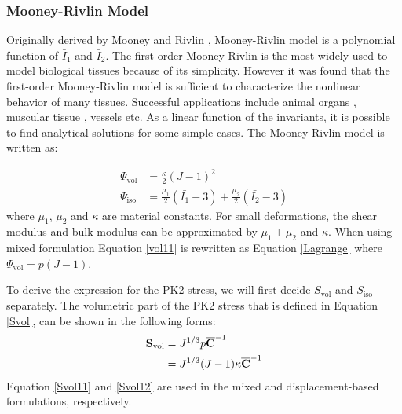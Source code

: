 \subsubsection{Mooney-Rivlin Model}
Originally derived by Mooney \cite{Mooney} and Rivlin \cite{Rivlin}, Mooney-Rivlin model is a polynomial function of $\bar{I}_1$ and $\bar{I}_2$. The first-order Mooney-Rivlin is the most widely used to model biological tissues because of its simplicity. However it was found that the first-order Mooney-Rivlin model is sufficient to characterize the nonlinear behavior of many tissues. Successful applications include animal organs \cite{Wall}, muscular tissue \cite{Bols2}, vessels \cite{Navidbakhsh} etc. As a linear function of the invariants, it is possible to find analytical solutions for some simple cases. The Mooney-Rivlin model is written as:

\begin{subequations}
\label{Mooney}
\begin{align}
\Psi_\mathrm{vol} &= \frac{\kappa}{2}(J - 1)^2 \label{vol11} \\
\Psi_\mathrm{iso} &= \frac{\mu_1}{2}(\bar{I_1} - 3) + \frac{\mu_2}{2}(\bar{I_2} - 3) \label{iso1}
\end{align}
\end{subequations}
where $\mu_1$, $\mu_2$ and $\kappa$ are material constants. For small deformations, the shear modulus and bulk modulus can be approximated by $\mu_1+\mu_2$ and $\kappa$. When using mixed formulation Equation \ref{vol11} is rewritten as Equation \ref{Lagrange} where $\Psi_\mathrm{vol} = p(J - 1) $.

To derive the expression for the PK2 stress, we will first decide $S_\mathrm{vol}$ and $S_\mathrm{iso}$ separately. The volumetric part of the PK2 stress that is defined in Equation \ref{Svol}, can be shown in the following forms:
\begin{subequations}
\label{Svol1}
\begin{align}
\bold{S}_\mathrm{vol} &= J^{1/3}p{\overline{\bold{C}}}^{-1} \label{Svol11}\\
		      &= {J^{1/3}(J-1)}\kappa {\overline{\bold{C}}}^{-1} \label{Svol12}
\end{align}
\end{subequations}
Equation \ref{Svol11} and \ref{Svol12} are used in the mixed and displacement-based formulations, respectively.

